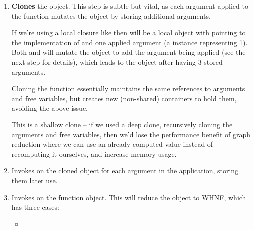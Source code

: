 \documentclass[dissertation.tex]{subfiles}
\begin{document}
{{{{\begin{enumerate}
{                }
                \item
                {

                    \textbf{Clones} the  object. This step is subtle but vital, as each argument applied
                    to the function mutates the  object by storing additional arguments.
                    
                    If we're using a local closure like  then
                     will be a local  object with  pointing to the
                    implementation of \haskell{(+)} and one applied argument (a  instance representing 1).
                    Both  and  will mutate the object to add the argument being applied
                    (see the next step for details), which leads to the  object after 
                    having 3 stored arguments.

                    Cloning the function essentially maintains the same references to arguments and free variables, but
                    creates new (non-shared) containers to hold them, avoiding the above issue.
                    
                    This is a shallow clone -- if we used a deep clone, recursively cloning the arguments and free
                    variables, then we'd lose the performance benefit of graph reduction where we can use an already
                    computed value instead of recomputing it ourselves, and increase memory usage.

                }
                \item
                {

                    Invokes  on the cloned object for each argument in the application, storing them
                    later use.

                }
                \item
                {

                    Invokes  on the function object. This will reduce the object to WHNF, which has three
                    cases:
                    
                    \begin{itemize}
                    \item
                    {

}
\end{itemize}}
\end{enumerate}}}}}
\end{document}
